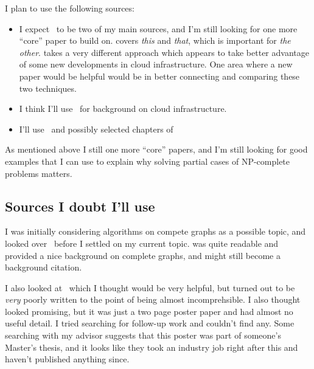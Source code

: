 \documentclass[sigplan,screen,nonacm]{acmart}
\begin{document}
I plan to use the following sources:
\begin{itemize}
\item I expect~\cite{OM:2008, prakash2013fractional} to be two of my main sources, and I'm still looking for one more ``core'' paper to build on. \cite{OM:2008} covers \emph{this} and \emph{that}, which is important for \emph{the other}. \cite{prakash2013fractional} takes a very different approach which appears to take better advantage of some new developments in cloud infrastructure. One area where a new paper would be helpful would be in better connecting and comparing these two techniques.
\item I think I'll use~\cite{Brun:2008} for background on cloud infrastructure. 
\item I'll use~\cite{Aaronson:2005, wiki:np-complete} and possibly selected chapters of~\cite{Garey:1979}
\end{itemize}

As mentioned above I still one more ``core'' papers, and I'm still looking for good examples that I can use to explain why solving partial cases of NP-complete problems matters.

\subsection{Sources I doubt I'll use}

I was initially considering algorithms on compete graphs as a possible topic, and looked over~\cite{winkler1984isometric, dobkin1987delaunay, folkman1970graphs} before I settled on my current topic. \cite{winkler1984isometric} was quite readable and provided a nice background on complete graphs, and might still become a background citation.

I also looked at~\cite{trulyFrightening2011} which I thought would be very helpful, but turned out to be \emph{very} poorly written to the point of being almost incomprehsible. I also thought~\cite{littlePoster2013} looked promising, but it was just a two page poster paper and had almost no useful detail. I tried searching for follow-up work and couldn't find any. Some searching with my advisor suggests that this poster was part of someone's Master's thesis, and it looks like they took an industry job right after this and haven't published anything since.


  

\end{document}
